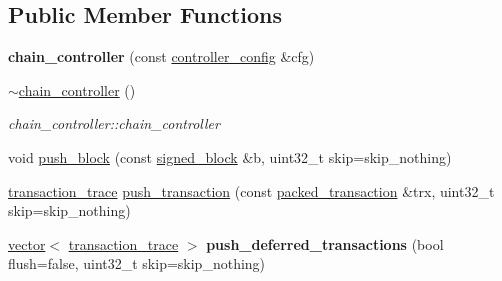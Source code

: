 \subsection*{Public Member Functions}
\begin{DoxyCompactItemize}
\item 
\mbox{\label{classaacio_1_1chain_1_1chain__controller_a32709d4149f3b16034490320d039e282}} 
{\bfseries chain\+\_\+controller} (const \mbox{\hyperlink{structaacio_1_1chain_1_1chain__controller_1_1controller__config}{controller\+\_\+config}} \&cfg)
\item 
\mbox{\label{classaacio_1_1chain_1_1chain__controller_abbd9c9571ad1aa4616d48fc66d392b5d}} 
\mbox{\hyperlink{classaacio_1_1chain_1_1chain__controller_abbd9c9571ad1aa4616d48fc66d392b5d}{$\sim$chain\+\_\+controller}} ()
\begin{DoxyCompactList}\small\item\em chain\+\_\+controller\+::chain\+\_\+controller \end{DoxyCompactList}\item 
void \mbox{\hyperlink{classaacio_1_1chain_1_1chain__controller_a23d273b6ef29d0c5c9f9f0bf61774024}{push\+\_\+block}} (const \mbox{\hyperlink{structaacio_1_1chain_1_1signed__block}{signed\+\_\+block}} \&b, uint32\+\_\+t skip=skip\+\_\+nothing)
\item 
\mbox{\hyperlink{structaacio_1_1chain_1_1transaction__trace}{transaction\+\_\+trace}} \mbox{\hyperlink{classaacio_1_1chain_1_1chain__controller_a9420fb823ef7fbd0a5745593fdc1aee7}{push\+\_\+transaction}} (const \mbox{\hyperlink{structaacio_1_1chain_1_1packed__transaction}{packed\+\_\+transaction}} \&trx, uint32\+\_\+t skip=skip\+\_\+nothing)
\item 
\mbox{\label{classaacio_1_1chain_1_1chain__controller_a3aafc80c3a7412b3d39c8bc845767527}} 
\mbox{\hyperlink{classstd_1_1vector}{vector}}$<$ \mbox{\hyperlink{structaacio_1_1chain_1_1transaction__trace}{transaction\+\_\+trace}} $>$ {\bfseries push\+\_\+deferred\+\_\+transactions} (bool flush=false, uint32\+\_\+t skip=skip\+\_\+nothing)
\item 
\mbox{\label{classaacio_1_1chain_1_1chain__controller_a8af766631ed0a2d5d4eb24e93acba0d4}} 

\end{DoxyCompactItemize}

